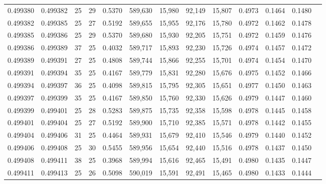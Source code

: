 \begin{tabular}{rrrrrrrrrrrrr}
0.499380 & 0.499382 &    25 &  29 &                                     0.5370 & 589,630 &  15,980 &  92,149 &  15,807 & 0.4973 & 0.1464 & 0.1480 \\
0.499382 & 0.499385 &    25 &  27 &                                     0.5192 & 589,655 &  15,955 &  92,176 &  15,780 & 0.4972 & 0.1462 & 0.1478 \\
0.499385 & 0.499386 &    25 &  29 &                                     0.5370 & 589,680 &  15,930 &  92,205 &  15,751 & 0.4972 & 0.1459 & 0.1476 \\
0.499386 & 0.499389 &    37 &  25 &                                     0.4032 & 589,717 &  15,893 &  92,230 &  15,726 & 0.4974 & 0.1457 & 0.1472 \\
0.499389 & 0.499391 &    27 &  25 &                                     0.4808 & 589,744 &  15,866 &  92,255 &  15,701 & 0.4974 & 0.1454 & 0.1470 \\
0.499391 & 0.499394 &    35 &  25 &                                     0.4167 & 589,779 &  15,831 &  92,280 &  15,676 & 0.4975 & 0.1452 & 0.1466 \\
0.499394 & 0.499397 &    36 &  25 &                                     0.4098 & 589,815 &  15,795 &  92,305 &  15,651 & 0.4977 & 0.1450 & 0.1463 \\
0.499397 & 0.499399 &    35 &  25 &                                     0.4167 & 589,850 &  15,760 &  92,330 &  15,626 & 0.4979 & 0.1447 & 0.1460 \\
0.499399 & 0.499401 &    25 &  28 &                                     0.5283 & 589,875 &  15,735 &  92,358 &  15,598 & 0.4978 & 0.1445 & 0.1458 \\
0.499401 & 0.499404 &    25 &  27 &                                     0.5192 & 589,900 &  15,710 &  92,385 &  15,571 & 0.4978 & 0.1442 & 0.1455 \\
0.499404 & 0.499406 &    31 &  25 &                                     0.4464 & 589,931 &  15,679 &  92,410 &  15,546 & 0.4979 & 0.1440 & 0.1452 \\
0.499406 & 0.499408 &    25 &  30 &                                     0.5455 & 589,956 &  15,654 &  92,440 &  15,516 & 0.4978 & 0.1437 & 0.1450 \\
0.499408 & 0.499411 &    38 &  25 &                                     0.3968 & 589,994 &  15,616 &  92,465 &  15,491 & 0.4980 & 0.1435 & 0.1447 \\
0.499411 & 0.499413 &    25 &  26 &                                     0.5098 & 590,019 &  15,591 &  92,491 &  15,465 & 0.4980 & 0.1433 & 0.1444 \\

\end{tabular}
